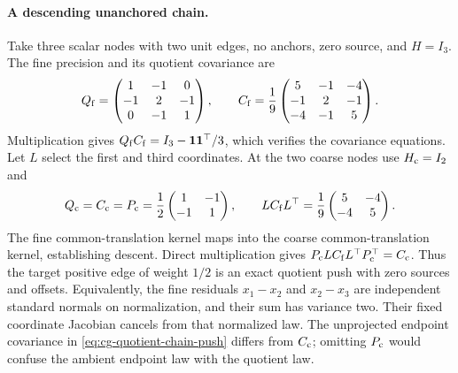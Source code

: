 \paragraph{A descending unanchored chain.}
Take three scalar nodes with two unit edges, no anchors,
zero source, and \(H=I_3\). The fine precision and its
quotient covariance are
\begin{equation}
Q_{\rm f}=\begin{pmatrix}
1&-1&0\\-1&2&-1\\0&-1&1
\end{pmatrix},\qquad
C_{\rm f}=\frac19\begin{pmatrix}
5&-1&-4\\-1&2&-1\\-4&-1&5
\end{pmatrix}.
\label{eq:cg-quotient-chain-data}
\end{equation}
Multiplication gives
\(Q_{\rm f}C_{\rm f}=I_3-\boldsymbol1\boldsymbol1^\top/3\),
which verifies the covariance equations.
Let \(L\) select the first and third coordinates.
At the two coarse nodes use \(H_{\rm c}=I_2\) and
\begin{equation}
Q_{\rm c}=C_{\rm c}=P_{\rm c}
=\frac12\begin{pmatrix}1&-1\\-1&1\end{pmatrix},\qquad
LC_{\rm f}L^\top
=\frac19\begin{pmatrix}5&-4\\-4&5\end{pmatrix}.
\label{eq:cg-quotient-chain-push}
\end{equation}
The fine common-translation kernel maps into the
coarse common-translation kernel, establishing descent.
Direct multiplication gives
\(P_{\rm c}LC_{\rm f}L^\top P_{\rm c}^\top=C_{\rm c}\).
Thus the target positive edge of weight \(1/2\) is an
exact quotient push with zero sources and offsets.
Equivalently, the fine residuals \(x_1-x_2\) and
\(x_2-x_3\) are independent standard normals on
normalization, and their sum has variance two.
Their fixed coordinate Jacobian cancels from that
normalized law. The unprojected endpoint covariance
in \eqref{eq:cg-quotient-chain-push} differs from
\(C_{\rm c}\); omitting \(P_{\rm c}\) would confuse
the ambient endpoint law with the quotient law.

